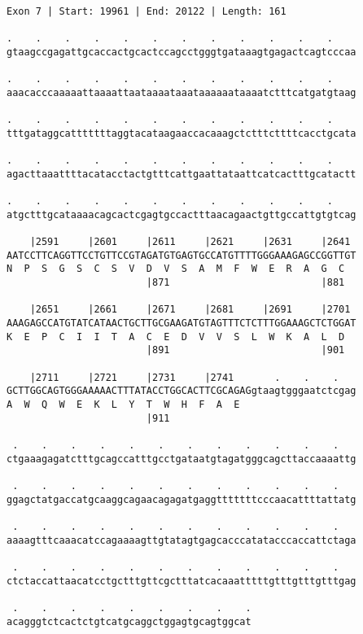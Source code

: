 \documentclass{article}
\begin{document}
\newpage
\begin{Verbatim}[fontfamily=courier]
Exon 7 | Start: 19961 | End: 20122 | Length: 161

.    .    .    .    .    .    .    .    .    .    .    .    
gtaagccgagattgcaccactgcactccagcctgggtgataaagtgagactcagtcccaa

.    .    .    .    .    .    .    .    .    .    .    .    
aaacacccaaaaattaaaattaataaaataaataaaaaataaaatctttcatgatgtaag

.    .    .    .    .    .    .    .    .    .    .    .    
tttgataggcatttttttaggtacataagaaccacaaagctctttcttttcacctgcata

.    .    .    .    .    .    .    .    .    .    .    .    
agacttaaattttacatacctactgtttcattgaattataattcatcactttgcatactt

.    .    .    .    .    .    .    .    .    .    .    .    
atgctttgcataaaacagcactcgagtgccactttaacagaactgttgccattgtgtcag

    |2591     |2601     |2611     |2621     |2631     |2641 
AATCCTTCAGGTTCCTGTTCCGTAGATGTGAGTGCCATGTTTTGGGAAAGAGCCGGTTGT
N  P  S  G  S  C  S  V  D  V  S  A  M  F  W  E  R  A  G  C  
                        |871                          |881  

    |2651     |2661     |2671     |2681     |2691     |2701 
AAAGAGCCATGTATCATAACTGCTTGCGAAGATGTAGTTTCTCTTTGGAAAGCTCTGGAT
K  E  P  C  I  I  T  A  C  E  D  V  V  S  L  W  K  A  L  D  
                        |891                          |901  

    |2711     |2721     |2731     |2741       .    .    .   
GCTTGGCAGTGGGAAAAACTTTATACCTGGCACTTCGCAGAGgtaagtgggaatctcgag
A  W  Q  W  E  K  L  Y  T  W  H  F  A  E                    
                        |911                                

 .    .    .    .    .    .    .    .    .    .    .    .   
ctgaaagagatctttgcagccatttgcctgataatgtagatgggcagcttaccaaaattg

 .    .    .    .    .    .    .    .    .    .    .    .   
ggagctatgaccatgcaaggcagaacagagatgaggtttttttcccaacattttattatg

 .    .    .    .    .    .    .    .    .    .    .    .   
aaaagtttcaaacatccagaaaagttgtatagtgagcacccatatacccaccattctaga

 .    .    .    .    .    .    .    .    .    .    .    .   
ctctaccattaacatcctgctttgttcgctttatcacaaatttttgtttgtttgtttgag

 .    .    .    .    .    .    .    .    .
acagggtctcactctgtcatgcaggctggagtgcagtggcat
\end{Verbatim}
\end{document}
